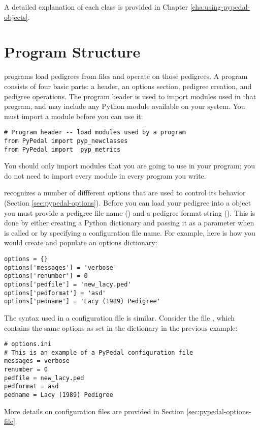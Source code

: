 A detailed explanation of each class is provided in Chapter \ref{cha:using-pypedal-objects}.
\section{Program Structure}
\label{sec:overview-program-structure}
\PyPedal{} programs load pedigrees from files and operate on those pedigrees.  A program consists of four basic parts: a header, an options section, pedigree creation, and pedigree operations.  The program header is used to import modules used in that program, and may include any Python module available on your system.  You must import a module before you can use it:
\begin{verbatim}
# Program header -- load modules used by a program
from PyPedal import pyp_newclasses
from PyPedal import  pyp_metrics
\end{verbatim}
You should only import modules that you are going to use in your program; you do not need to import every \PyPedal{} module in every program you write.

\PyPedal{} recognizes a number of diffferent options that are used to control its behavior (Section \ref{sec:pypedal-options}).  Before you can load your pedigree into a \PyPedal{} object you must provide a pedigree file name () and a pedigree format string ().  This is done by either creating a Python dictionary and passing it as a parameter when  is called or by specifying a configuration file name.  For example, here is how you would create and populate an options dictionary:
\begin{verbatim}
options = {}
options['messages'] = 'verbose'
options['renumber'] = 0
options['pedfile'] = 'new_lacy.ped'
options['pedformat'] = 'asd'
options['pedname'] = 'Lacy (1989) Pedigree'
\end{verbatim}
The syntax used in a configuration file is similar.  Consider the file , which contains the same options as set in the  dictionary in the previous example:
\begin{verbatim}
# options.ini
# This is an example of a PyPedal configuration file
messages = verbose
renumber = 0
pedfile = new_lacy.ped
pedformat = asd
pedname = Lacy (1989) Pedigree
\end{verbatim}
More details on configuration files are provided in Section \ref{sec:pypedal-options-file}.

